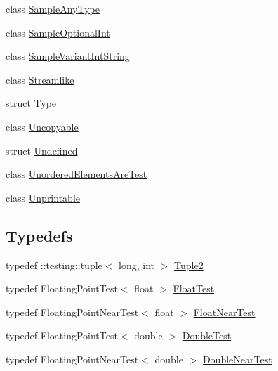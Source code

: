 \begin{DoxyCompactItemize}
class \mbox{\hyperlink{classtesting_1_1gmock__matchers__test_1_1_sample_any_type}{Sample\+Any\+Type}}
\item 
class \mbox{\hyperlink{classtesting_1_1gmock__matchers__test_1_1_sample_optional_int}{Sample\+Optional\+Int}}
\item 
class \mbox{\hyperlink{classtesting_1_1gmock__matchers__test_1_1_sample_variant_int_string}{Sample\+Variant\+Int\+String}}
\item 
class \mbox{\hyperlink{classtesting_1_1gmock__matchers__test_1_1_streamlike}{Streamlike}}
\item 
struct \mbox{\hyperlink{structtesting_1_1gmock__matchers__test_1_1_type}{Type}}
\item 
class \mbox{\hyperlink{classtesting_1_1gmock__matchers__test_1_1_uncopyable}{Uncopyable}}
\item 
struct \mbox{\hyperlink{structtesting_1_1gmock__matchers__test_1_1_undefined}{Undefined}}
\item 
class \mbox{\hyperlink{classtesting_1_1gmock__matchers__test_1_1_unordered_elements_are_test}{Unordered\+Elements\+Are\+Test}}
\item 
class \mbox{\hyperlink{classtesting_1_1gmock__matchers__test_1_1_unprintable}{Unprintable}}
\end{DoxyCompactItemize}
\subsection*{Typedefs}
\begin{DoxyCompactItemize}
\item 
typedef \+::testing\+::tuple$<$ long, int $>$ \mbox{\hyperlink{namespacetesting_1_1gmock__matchers__test_a8b82c859cd28da9e7f7d4c6091a3165c}{Tuple2}}
\item 
typedef Floating\+Point\+Test$<$ float $>$ \mbox{\hyperlink{namespacetesting_1_1gmock__matchers__test_a145329e433869625f9f0e98a0cdfd7b4}{Float\+Test}}
\item 
typedef Floating\+Point\+Near\+Test$<$ float $>$ \mbox{\hyperlink{namespacetesting_1_1gmock__matchers__test_a426b51f464dcb48033946e1bf3cc8795}{Float\+Near\+Test}}
\item 
typedef Floating\+Point\+Test$<$ double $>$ \mbox{\hyperlink{namespacetesting_1_1gmock__matchers__test_a944cdd366ed240f29ae8e3ebc753ad5c}{Double\+Test}}
\item 
typedef Floating\+Point\+Near\+Test$<$ double $>$ \mbox{\hyperlink{namespacetesting_1_1gmock__matchers__test_aea537d0183ccc65b5c49a75d711993c8}{Double\+Near\+Test}}
\end{DoxyCompactItemize}
